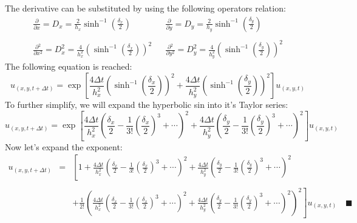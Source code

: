 \documentclass[11pt, a4paper]{article}
\newcommand{\parder}[2]{\frac{\partial {#1}}{\partial {#2}}}
\begin{document}
The derivative can be substituted by using the following operators relation:
\begin{equation}
    \begin{matrix}
        \displaystyle \parder{}{x}=D_x=\frac{2}{h_x}\sinh^{-1}{\left(\frac{\delta_x}{2}\right)} && \displaystyle \parder{}{y}=D_y=\frac{2}{h_y}\sinh^{-1}{\left(\frac{\delta_y}{2}\right)} \\\\
        \displaystyle \parder{^2}{x^2}=D_x^2=\frac{4}{h_x^2}\left(\sinh^{-1}{\left(\frac{\delta_x}{2}\right)}\right)^2 && \displaystyle \parder{^2}{y^2}=D_y^2=\frac{4}{h_y^2}\left(\sinh^{-1}{\left(\frac{\delta_y}{2}\right)}\right)^2
    \end{matrix}
\end{equation}
The following equation is reached:
\begin{equation}
    \displaystyle u_{\left(x,y,t+\Delta t\right)}=\exp{\left[\frac{4\Delta t}{h_x^2}\left(\sinh^{-1}{\left(\frac{\delta_x}{2}\right)}\right)^2+\frac{4\Delta t}{h_y^2}\left(\sinh^{-1}{\left(\frac{\delta_y}{2}\right)}\right)^2\right]}u_{\left(x,y,t\right)}
\end{equation}
To further simplify, we will expand the hyperbolic sin into it's Taylor series:
\begin{equation}
    \displaystyle u_{\left(x,y,t+\Delta t\right)}=\exp{\left[\frac{4\Delta t}{h_x^2}\left(\frac{\delta_x}{2}-\frac{1}{3!}\left(\frac{\delta_x}{2}\right)^3+\cdots\right)^2+\frac{4\Delta t}{h_y^2}\left(\frac{\delta_y}{2}-\frac{1}{3!}\left(\frac{\delta_y}{2}\right)^3+\cdots\right)^2\right]}u_{\left(x,y,t\right)}
\end{equation}
Now let's expand the exponent:
\begin{equation}
    \begin{array}{rcl}
        \displaystyle u_{\left(x,y,t+\Delta t\right)} & = & \displaystyle \left[1+\frac{4\Delta t}{h_x^2}\left(\frac{\delta_x}{2}-\frac{1}{3!}\left(\frac{\delta_x}{2}\right)^3+\cdots\right)^2+\frac{4\Delta t}{h_y^2}\left(\frac{\delta_y}{2}-\frac{1}{3!}\left(\frac{\delta_y}{2}\right)^3+\cdots\right)^2\right. \\\\
        && \displaystyle +\left.\frac{1}{2!}\left(\frac{4\Delta t}{h_x^2}\left(\frac{\delta_x}{2}-\frac{1}{3!}\left(\frac{\delta_x}{2}\right)^3+\cdots\right)^2+\frac{4\Delta t}{h_y^2}\left(\frac{\delta_y}{2}-\frac{1}{3!}\left(\frac{\delta_y}{2}\right)^3+\cdots\right)^2\right)^2\right]u_{\left(x,y,t\right)}\quad\blacksquare
    \end{array}
\end{equation}
\end{document}
